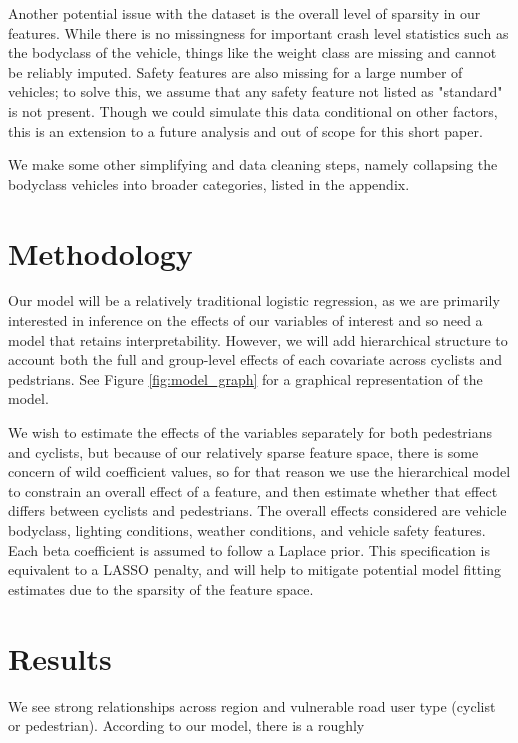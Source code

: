 \documentclass[12pt]{article}
\begin{document}
Another potential issue with the dataset is the overall level of sparsity in our features. While there is no
missingness for important crash level statistics such as the bodyclass of the vehicle, things like the weight class
are missing and cannot be reliably imputed. Safety features are also missing for a large number of vehicles; to solve
this, we assume that any safety feature not listed as "standard" is not present. Though we could simulate this data
conditional on other factors, this is an extension to a future analysis and out of scope for this short paper.

We make some other simplifying and data cleaning steps, namely collapsing the bodyclass vehicles into broader categories,
listed in the appendix.

\section{Methodology}

Our model will be a relatively traditional logistic regression, as we are primarily interested in inference on the
effects of our variables of interest and so need a model that retains interpretability. However, we will
add hierarchical structure to account both the full and group-level effects of each covariate across
cyclists and pedstrians. See Figure \ref{fig:model_graph} for a graphical representation of the model.

We wish to estimate the effects of the variables separately for both pedestrians and cyclists, but because of our
relatively sparse feature space, there is some concern of wild coefficient values, so for that reason we use the
hierarchical model to constrain an overall effect of a feature, and then estimate whether that effect differs
between cyclists and pedestrians. The overall effects considered are vehicle bodyclass, lighting conditions, weather
conditions, and vehicle safety features. Each beta coefficient is assumed to follow a Laplace prior. This specification
is equivalent to a LASSO penalty\cite{tibshirani_regression_1996}, and will help to mitigate potential model fitting
estimates due to the sparsity of the feature space.

\section{Results}

We see strong relationships across region and vulnerable road user type (cyclist or pedestrian). According to our
model, there is a roughly
\end{document}
